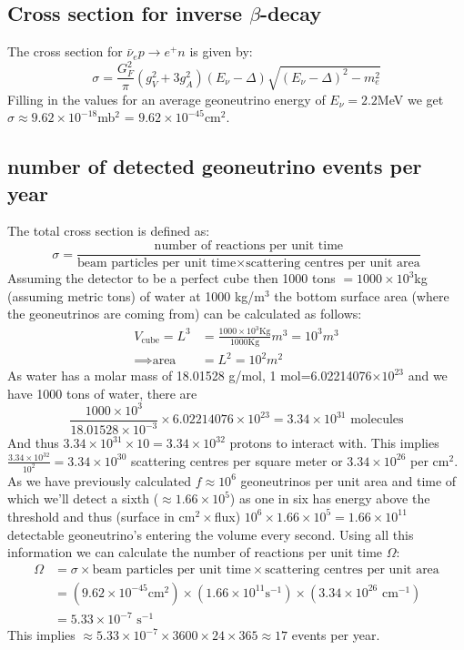 \documentclass[10pt,a4paper,twoside]{article}
\begin{document}
\subsection{Cross section for inverse $\beta$-decay}
The cross section for $\bar{\nu}_e p \rightarrow e^+ n$ is given by:
\begin{equation}
	\sigma = \frac{G_F^2}{\pi}(g_V^2+3g_A^2)(E_\nu-\Delta)\sqrt{(E_\nu-\Delta)^2-m_e^2}
\end{equation}
Filling in the values for an average geoneutrino energy of $E_\nu = 2.2$MeV we get $\sigma\approx9.62\times10^{-18}$mb$^2$ = $9.62\times10^{-45}$cm$^2$.
\subsection{number of detected geoneutrino events per year}
The total cross section is defined as:
\begin{equation}
	\sigma = \frac{\text{number of reactions per unit time}}{\text{beam particles per unit time}\times\text{scattering centres per unit area}}
\end{equation}
Assuming the detector to be a perfect cube then 1000 tons $= 1000\times10^3$kg (assuming metric tons) of water at 1000 kg/m$^3$ the bottom surface area (where the geoneutrinos are coming from) can be calculated as follows:
\begin{align}
	V_{\text{cube}} = L^3 &= \frac{1000\times10^3 \text{Kg}}{1000\text{Kg}}m^3 = 10^3 m^3\\
	\implies \text{area} &= L^2 = 10^2 m^2
\end{align}
As water has a molar mass of 18.01528 g/mol, 1 mol=6.02214076$\times10^{23}$ and we have 1000 tons of water, there are
\begin{equation}
	\frac{1000\times10^3}{18.01528\times10^{-3}}\times6.02214076\times10^{23} = 3.34\times10^{31} \text{ molecules}
\end{equation}
And thus $3.34\times10^{31}\times10 = 3.34\times10^{32}$ protons to interact with. This implies $\frac{3.34\times10^{32}}{10^2} = 3.34\times10^{30}$ scattering centres per square meter or $3.34\times10^{26}$ per cm$^2$. As we have previously calculated $f \approx 10^6$ geoneutrinos per unit area and time of which we'll detect a sixth ($\approx 1.66\times10^5$) as one in six has energy above the threshold and thus (surface in cm$^2\times$flux) $10^6\times1.66\times10^5 = 1.66\times10^{11}$ detectable geoneutrino's entering the volume every second. Using all this information we can calculate the number of reactions per unit time $\Omega$:
\begin{align}
	\Omega &= \sigma \times \text{beam particles per unit time} \times \text{scattering centres per unit area}\\
	 &= (9.62\times10^{-45}\text{cm}^2) \times (1.66\times10^{11} \text{s}^{-1}) \times (3.34\times10^{26}\text{ cm}^{-1})\\
	 &= 5.33\times10^{-7}\text{ s}^{-1}
\end{align}
This implies $\approx 5.33\times10^{-7} \times3600\times24\times365 \approx 17$ events per year.
\end{document}
